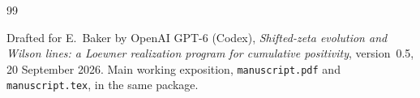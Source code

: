\begin{thebibliography}{99}
\raggedright
\setlength{\itemsep}{2pt}
Drafted for E.~Baker by OpenAI GPT-6 (Codex),
\emph{Shifted-zeta evolution and Wilson lines: a Loewner realization
program for cumulative positivity}, version~0.5, 20 September 2026.
Main working exposition, \nolinkurl{manuscript.pdf}
and \nolinkurl{manuscript.tex}, in the same package.

\end{thebibliography}
